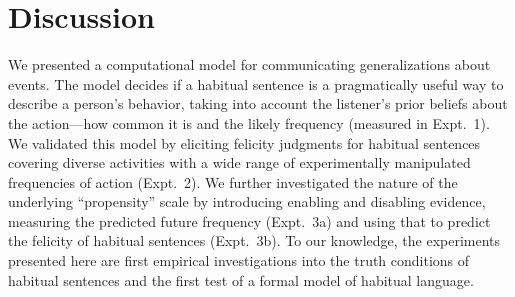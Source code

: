 \documentclass[10pt,letterpaper]{article}
\begin{document}



\section{Discussion}
We presented a computational model for communicating generalizations about events.
The model decides if a habitual sentence is a pragmatically useful way to describe a person's behavior, taking into account the listener's prior beliefs about the action---how common it is and the likely frequency (measured in Expt.~1).
We validated this model by eliciting felicity judgments for habitual sentences covering diverse activities with a wide range of experimentally manipulated frequencies of action (Expt.~2).
We further investigated the nature of the underlying ``propensity'' scale by introducing enabling and disabling evidence, measuring the predicted future frequency (Expt.~3a) and using that to predict the felicity of habitual sentences (Expt.~3b). 
To our knowledge, the experiments presented here are first empirical investigations into the truth conditions of habitual sentences and the first test of a formal model of habitual language.


\end{document}
